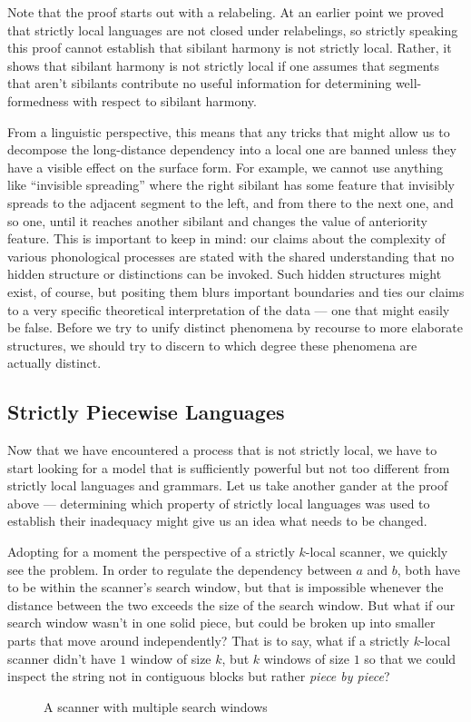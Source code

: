 Note that the proof starts out with a relabeling.
At an earlier point we proved that strictly local languages are not closed under relabelings, so strictly speaking this proof cannot establish that sibilant harmony is not strictly local.
Rather, it shows that sibilant harmony is not strictly local if one assumes that segments that aren't sibilants contribute no useful information for determining well-formedness with respect to sibilant harmony.

From a linguistic perspective, this means that any tricks that might allow us to decompose the long-distance dependency into a local one are banned unless they have a visible effect on the surface form.
For example, we cannot use anything like ``invisible spreading'' where the right sibilant has some feature that invisibly spreads to the adjacent segment to the left, and from there to the next one, and so one, until it reaches another sibilant and changes the value of anteriority feature.
This is important to keep in mind: our claims about the complexity of various phonological processes are stated with the shared understanding that no hidden structure or distinctions can be invoked.
Such hidden structures might exist, of course, but positing them blurs important boundaries and ties our claims to a very specific theoretical interpretation of the data --- one that might easily be false.
Before we try to unify distinct phenomena by recourse to more elaborate structures, we should try to discern to which degree these phenomena are actually distinct.

\subsection{Strictly Piecewise Languages}

Now that we have encountered a process that is not strictly local, we have to start looking for a model that is sufficiently powerful but not too different from strictly local languages and grammars.
Let us take another gander at the proof above --- determining which property of strictly local languages was used to establish their inadequacy might give us an idea what needs to be changed.

Adopting for a moment the perspective of a strictly $k$-local scanner, we quickly see the problem.
In order to regulate the dependency between $a$ and $b$, both have to be within the scanner's search window, but that is impossible whenever the distance between the two exceeds the size of the search window.
But what if our search window wasn't in one solid piece, but could be broken up into smaller parts that move around independently?
That is to say, what if a strictly $k$-local scanner didn't have $1$ window of size $k$, but $k$ windows of size $1$ so that we could inspect the string not in contiguous blocks but rather \emph{piece by piece}?
%
\begin{figure}[tbph]
\centering

\caption{A scanner with multiple search windows}
\label{fig:SP_Scanner}
\end{figure}

